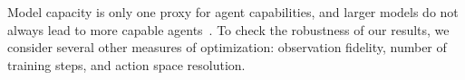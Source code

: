  



Model capacity is only one proxy for agent capabilities, and larger 
models do not always lead to more capable agents~\citep{andrychowicz2020matters}. To check the robustness of our results, we consider several other measures of optimization: observation fidelity, number of training steps, and action space resolution.

